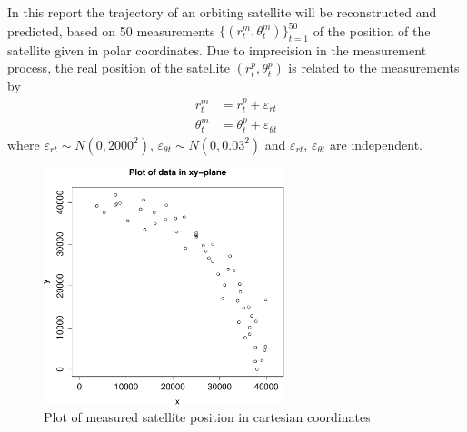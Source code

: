 \def\assignmenttitle{Estimating the Trajectory of a Satellite}
\def\assignmentnumber{5}
\def\assignmentdate{02-12-2011}
\def\githuburl{\small\url{https://github.com/alphabits/dtu-fall-2011/tree/master/02417/assignment-5}}
\def\githuburlfoot{\footnotesize\url{https://github.com/alphabits/dtu-fall-2011/tree/master/02417/assignment-5}}

\def\myepsilon{\varepsilon}
\def\erm{\myepsilon_{rt}}
\def\etm{\myepsilon_{\theta t}}
\def\erp{\myepsilon^p_{rt}}
\def\etp{\myepsilon^p_{\theta t}}
\def\evp{\myepsilon^p_{v_\theta t}}
\def\vecX{\myvec{X}}
\def\vecYt{\myvec{Y}_t}
\def\vece{\myvec{e}}
\def\vecSigma{\myvec{\Sigma}}
\def\vecA{\myvec{A}}
\def\vecC{\myvec{C}}






\maketitle

In this report the trajectory of an orbiting satellite will be reconstructed and predicted, based on 50 measurements $\{(r_t^m, \theta_t^m)\}_{t=1}^{50}$ of the position of the satellite given in polar coordinates. Due to imprecision in the measurement process, the real position of the satellite $(r_t^p, \theta_t^p)$ is related to the measurements by
\begin{align*}
    r_t^m &= r_t^p + \erm \\
    \theta_t^m &= \theta_t^p + \etm
\end{align*}
where $\erm\sim N(0,2000^2)$, $\etm\sim N(0,0.03^2)$ and $\erm$, $\etm$ are independent.

\begin{figure}[!th]
    \centering
    \includegraphics[width=70mm]{../plots/data.pdf}
    \caption{Plot of measured satellite position in cartesian coordinates}
    \label{fig:data}
\end{figure}

